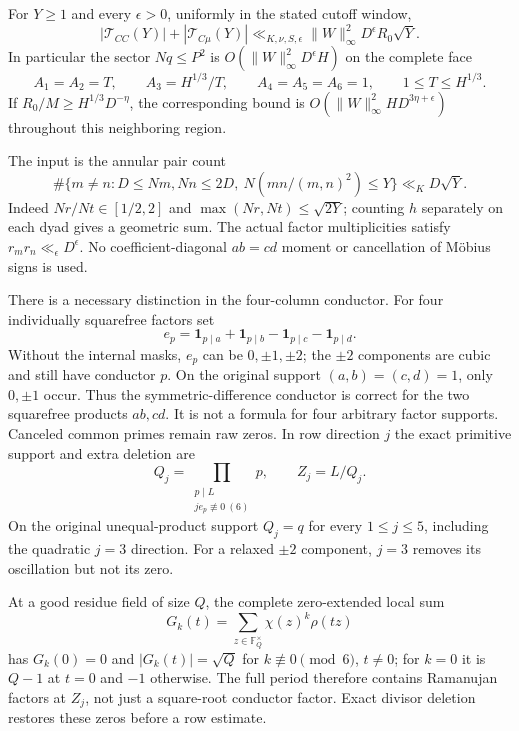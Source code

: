 \begin{proposition}
\label{upq:small}
For $Y\ge1$ and every $\epsilon>0$, uniformly in the stated cutoff window,
\begin{equation}\label{upq:sc}
 |\mathcal T_{CC}(Y)|+|\mathcal T_{C\mu}(Y)|
 \ll_{K,\nu,S,\epsilon}
 \|W\|_\infty^2D^\epsilon R_0\sqrt Y.
\end{equation}
In particular the sector $Nq\le P^2$ is
$O(\|W\|_\infty^2D^\epsilon H)$ on the complete face
\begin{equation}\label{upq:face}
 A_1=A_2=T,\qquad A_3=H^{1/3}/T,\qquad
 A_4=A_5=A_6=1,\qquad 1\le T\le H^{1/3}.
\end{equation}
If $R_0/M\ge H^{1/3}D^{-\eta}$, the corresponding bound is
$O(\|W\|_\infty^2H D^{3\eta+\epsilon})$ throughout this neighboring region.
\end{proposition}

The input is the annular pair count
\[
 \#\{m\ne n:D\le Nm,Nn\le2D,\ N(mn/(m,n)^2)\le Y\}
 \ll_K D\sqrt Y.
\]
Indeed $Nr/Nt\in[1/2,2]$ and
$\max(Nr,Nt)\le\sqrt{2Y}$; counting $h$ separately on each dyad gives a
geometric sum. The actual factor multiplicities satisfy
$r_mr_n\ll_\epsilon D^\epsilon$. No coefficient-diagonal
$ab=cd$ moment or cancellation of M\"obius signs is used.

There is a necessary distinction in the four-column conductor.
For four individually squarefree factors set
\[
 e_p=\mathbf1_{p\mid a}+\mathbf1_{p\mid b}
       -\mathbf1_{p\mid c}-\mathbf1_{p\mid d}.
\]
Without the internal masks, $e_p$ can be $0,\pm1,\pm2$; the $\pm2$
components are cubic and still have conductor $p$. On the original
support $(a,b)=(c,d)=1$, only $0,\pm1$ occur. Thus the
symmetric-difference conductor is correct for the two squarefree
products $ab,cd$. It is not a formula for four arbitrary factor supports.
Canceled common primes remain raw zeros. In row direction $j$ the exact
primitive support and extra deletion are
\[
 Q_j=\prod_{\substack{p\mid L\\je_p\not\equiv0\ (6)}}p,\qquad
 Z_j=L/Q_j.
\]
On the original unequal-product support $Q_j=q$ for every $1\le j\le5$,
including the quadratic $j=3$ direction. For a relaxed $\pm2$ component,
$j=3$ removes its oscillation but not its zero.

At a good residue field of size $Q$, the complete zero-extended local sum
\[
 G_k(t)=\sum_{z\in\mathbb F_Q^\times}\chi(z)^k\rho(tz)
\]
has $G_k(0)=0$ and $|G_k(t)|=\sqrt Q$ for $k\not\equiv0\pmod6$, $t\ne0$;
for $k=0$ it is $Q-1$ at $t=0$ and $-1$ otherwise.
The full period therefore contains Ramanujan factors at $Z_j$, not just
a square-root conductor factor. Exact divisor deletion restores these
zeros before a row estimate.

